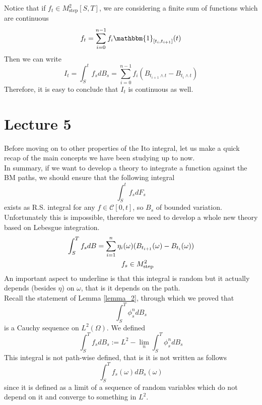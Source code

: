 \begin{itemize}
    Notice that if $f_t \in M^2_{\text{step}} [S,T]$, we are considering a finite sum of functions which are continuous
    \begin{equation*}
        f_t = \sum_{i=0}^{n-1} f_i \mathbbm{1}_{[t_i,t_{i+1}]}(t)
    \end{equation*}
    Then we can write
    \begin{equation*}
        I_t = \int_S^t f_s dB_s = \sum_{i=0}^{n-1} f_i(B_{t_{i+1} \wedge t} - B_{t_i \wedge t})
    \end{equation*}
    Therefore, it is easy to conclude that $I_t$ is continuous as well. 
\end{itemize}




\section{Lecture 5}
Before moving on to other properties of the Ito integral, let us make a quick recap of the main concepts we have been studying up to now. \\

In summary, if we want to develop a theory to integrate a function against the BM paths, we should ensure that the following integral 
\begin{equation*}
    \int_S^t f_s d F_s 
\end{equation*}
exists as R.S. integral for any $f \in \mathcal{C}[0,t]$, so $B_s$ of bounded variation. Unfortunately this is impossible, therefore we need to develop a whole new theory based on Lebesgue integration. \\
\begin{equation*}
\begin{split}
     \int_S^T f_s dB = \sum_{i=1}^n \eta_i (\omega)(B_{t_{i+1}}(\omega) - B_{t_i}(\omega))\\
    f_s \in M^2_{\text{step}} \hspace{2 cm}
\end{split}  
\end{equation*}
An important aspect to underline is that this integral is random but it actually depends (besides $\eta$) on $\omega$, that is it depends on the path.\\
Recall the statement of Lemma \ref{lemma_2}, through which we proved that 
\begin{equation*}
    \int_S^T \phi_s^n dB_s
\end{equation*}
is a Cauchy sequence on $L^2(\Omega)$.
We defined 
\begin{equation*}
    \int_S^T f_s dB_s := L^2 - \lim_n \int_S^T \phi_s^n dB_s    
\end{equation*}
This integral is not path-wise defined, that is it is not written as follows
\begin{equation*}
    \int_S^T f_s(\omega) dB_s(\omega)
\end{equation*}
since it is defined as a limit of a sequence of random variables which do not depend on it and converge to something in $L^2$.

